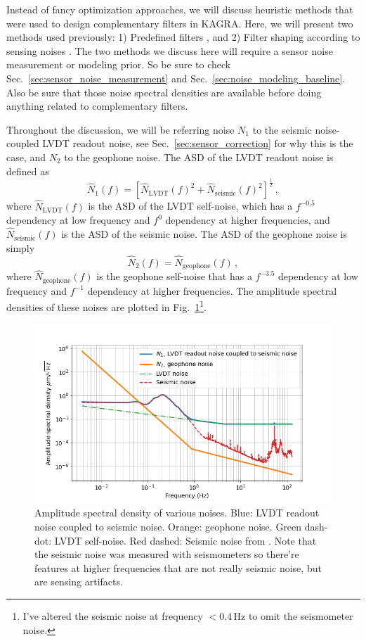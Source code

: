 Instead of fancy optimization approaches, we will discuss heuristic methods that were used to design complementary filters in KAGRA.
Here, we will present two methods used previously: 1) Predefined filters \cite{Sekiguchi:2016bmv, Heijningen:2018evm}, and 2) Filter shaping according to sensing noises \cite{low_frequency_optimization_and_performance_of_advanced_virgo_seismic_isolation_system}.
The two methods we discuss here will require a sensor noise measurement or modeling prior.
So be sure to check Sec.~\ref{sec:sensor_noise_measurement} and Sec.~\ref{sec:noise_modeling_baseline}.
Also be sure that those noise spectral densities are available before doing anything related to complementary filters.

Throughout the discussion, we will be referring noise $N_1$ to the seismic noise-coupled LVDT readout noise, see Sec.~\ref{sec:sensor_correction} for why this is the case, and $N_2$ to the geophone noise.
The ASD of the LVDT readout noise is defined as
\begin{equation}
	\hat{N}_1(f) = \left[ \hat{N}_\mathrm{LVDT}(f)^2 + \hat{N}_\mathrm{seismic}(f)^2 \right]^\frac{1}{2}\,,
	\label{eqn:seismic_noise_coupled_lvdt_noise}
\end{equation}
where $\hat{N}_\mathrm{LVDT}(f)$ is the ASD of the LVDT self-noise, which has a $f^{-0.5}$ dependency at low frequency and $f^{0}$ dependency at higher frequencies, and $\hat{N}_\mathrm{seismic}(f)$ is the ASD of the seismic noise.
The ASD of the geophone noise is simply
\begin{equation}
	\hat{N}_2(f) = \hat{N}_\mathrm{geophone}(f)\,,
\end{equation}
where $\hat{N}_\mathrm{geophone}(f)$ is the geophone self-noise that has a $f^{-3.5}$ dependency at low frequency and $f^{-1}$ dependency at higher frequencies.
The amplitude spectral densities of these noises are plotted in Fig.~\ref{fig:sensornoisesforcomplementaryfilter}\footnote{I've altered the seismic noise at frequency $<0.4\,\mathrm{Hz}$ to omit the seismometer noise.}.
\begin{figure}[!h]
	\centering
	\includegraphics[width=0.7\linewidth]{figures/sensor_noises_for_complementary_filter}
	\caption{Amplitude spectral density of various noises. Blue: LVDT readout noise coupled to seismic noise. Orange: geophone noise. Green dash-dot: LVDT self-noise. Red dashed: Seismic noise from \cite{seismic_noise_kagra}. Note that the seismic noise was measured with seismometers so there're features at higher frequencies that are not really seismic noise, but are sensing artifacts. }
	\label{fig:sensornoisesforcomplementaryfilter}
\end{figure}

